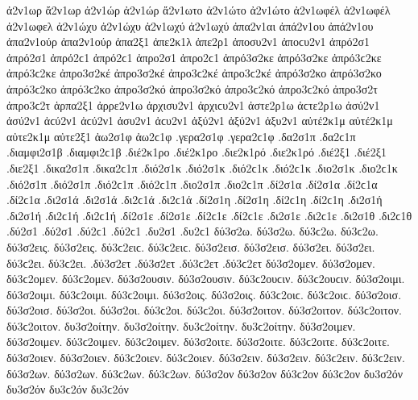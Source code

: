 {ἀ2ν1ωρ   %
ἄ2ν1ωρ   %
ἀ2ν1ώρ ἀ2ν1ώρ 
ἄ2ν1ωτο   %
ἀ2ν1ώτο ἀ2ν1ώτο 
ἀ2ν1ωφέλ ἀ2ν1ωφέλ   %
ἀ2ν1ωφελ   %
ἀ2ν1ώχυ ἀ2ν1ώχυ   %
ἀ2ν1ωχύ ἀ2ν1ωχύ 
ἀπα2ν1αι   %
ἀπά2ν1ου ἀπά2ν1ου   %
ἀπα2ν1ούρ ἀπα2ν1ούρ 
ἁπα2ξ1   %
ἀπε2κ1λ   %
ἁπε2ρ1   %
ἀποσυ2ν1 ἀποϲυ2ν1   %
ἀπρό2σ1 ἀπρό2σ1 ἀπρό2ϲ1 ἀπρό2ϲ1   %
ἀπρο2σ1 ἀπρο2ϲ1 
ἀπρό3σ2κε ἀπρό3σ2κε ἀπρό3ϲ2κε ἀπρό3ϲ2κε   %
ἀπρο3σ2κέ ἀπρο3σ2κέ ἀπρο3ϲ2κέ ἀπρο3ϲ2κέ 
ἀπρό3σ2κο ἀπρό3σ2κο ἀπρό3ϲ2κο ἀπρό3ϲ2κο   %
ἀπρο3σ2κό ἀπρο3σ2κό ἀπρο3ϲ2κό ἀπρο3ϲ2κό 
ἀπρο3σ2τ ἀπρο3ϲ2τ   %
ἁρπα2ξ1   %
ἀρρε2ν1ω   %
ἀρχισυ2ν1 ἀρχιϲυ2ν1   %
ἀστε2ρ1ω ἀϲτε2ρ1ω   %
ἀσύ2ν1 ἀσύ2ν1 ἀϲύ2ν1 ἀϲύ2ν1   %
ἀσυ2ν1 ἀϲυ2ν1 
ἀξύ2ν1 ἀξύ2ν1   %
ἀξυ2ν1 
αὐτέ2κ1μ αὐτέ2κ1μ   %
αὐτε2κ1μ 
αὐτε2ξ1   %
ἀω2σ1φ ἀω2ϲ1φ   %
.γερα2σ1φ .γερα2ϲ1φ   %
.δα2σ1π .δα2ϲ1π   %
.διαμφι2σ1β .διαμφι2ϲ1β   %
.διέ2κ1ρο .διέ2κ1ρο   %
.διε2κ1ρό .διε2κ1ρό 
.διέ2ξ1 .διέ2ξ1   %
.διε2ξ1   %
.δικα2σ1π .δικα2ϲ1π   %
.διό2σ1κ .διό2σ1κ .διό2ϲ1κ .διό2ϲ1κ   %
.διο2σ1κ .διο2ϲ1κ 
.διό2σ1π .διό2σ1π .διό2ϲ1π .διό2ϲ1π   %
.διο2σ1π .διο2ϲ1π 
.δί2σ1α .δί2σ1α .δί2ϲ1α .δί2ϲ1α   %
.δι2σ1ά .δι2σ1ά .δι2ϲ1ά .δι2ϲ1ά 
.δί2σ1η .δί2σ1η .δί2ϲ1η .δί2ϲ1η   %
.δι2σ1ή .δι2σ1ή .δι2ϲ1ή .δι2ϲ1ή 
.δί2σ1ε .δί2σ1ε .δί2ϲ1ε .δί2ϲ1ε   %
.δι2σ1ε .δι2ϲ1ε 
.δι2σ1θ .δι2ϲ1θ   %
.δύ2σ1 .δύ2σ1 .δύ2ϲ1 .δύ2ϲ1   %
.δυ2σ1 .δυ2ϲ1 
%
δύ3σ2ω. δύ3σ2ω. δύ3ϲ2ω. δύ3ϲ2ω.   %
δύ3σ2εις. δύ3σ2εις. δύ3ϲ2ειϲ. δύ3ϲ2ειϲ. 
δύ3σ2εισ. δύ3σ2εισ. 
δύ3σ2ει. δύ3σ2ει. δύ3ϲ2ει. δύ3ϲ2ει. 
.δύ3σ2ετ .δύ3σ2ετ .δύ3ϲ2ετ .δύ3ϲ2ετ 
δύ3σ2ομεν. δύ3σ2ομεν. δύ3ϲ2ομεν. δύ3ϲ2ομεν. 
δύ3σ2ουσιν. δύ3σ2ουσιν. δύ3ϲ2ουϲιν. δύ3ϲ2ουϲιν. 
δύ3σ2οιμι. δύ3σ2οιμι. δύ3ϲ2οιμι. δύ3ϲ2οιμι. 
δύ3σ2οις. δύ3σ2οις. δύ3ϲ2οιϲ. δύ3ϲ2οιϲ. 
δύ3σ2οισ. δύ3σ2οισ. 
δύ3σ2οι. δύ3σ2οι. δύ3ϲ2οι. δύ3ϲ2οι. 
δύ3σ2οιτον. δύ3σ2οιτον. δύ3ϲ2οιτον. δύ3ϲ2οιτον. 
δυ3σ2οίτην. δυ3σ2οίτην. δυ3ϲ2οίτην. δυ3ϲ2οίτην. 
δύ3σ2οιμεν. δύ3σ2οιμεν. δύ3ϲ2οιμεν. δύ3ϲ2οιμεν. 
δύ3σ2οιτε. δύ3σ2οιτε. δύ3ϲ2οιτε. δύ3ϲ2οιτε. 
δύ3σ2οιεν. δύ3σ2οιεν. δύ3ϲ2οιεν. δύ3ϲ2οιεν. 
δύ3σ2ειν. δύ3σ2ειν. δύ3ϲ2ειν. δύ3ϲ2ειν. 
δύ3σ2ων. δύ3σ2ων. δύ3ϲ2ων. δύ3ϲ2ων. δύ3σ2ον δύ3σ2ον δύ3ϲ2ον δύ3ϲ2ον δυ3σ2όν δυ3σ2όν δυ3ϲ2όν δυ3ϲ2όν 
}
